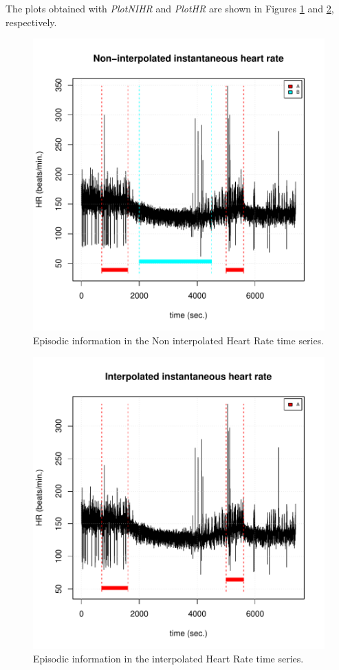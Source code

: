 \documentclass[12pt,lot, lof]{puthesis}
\begin{document}
The plots obtained with \textit{PlotNIHR} and \textit{PlotHR} are shown in 
Figures \ref{fig:plottingEpisodicNIHR} and \ref{fig:plottingEpisodicHR}, 
respectively.
\begin{figure}[h]
\centering
\includegraphics{figures/tutorial-plottingEpisodicNIHR}
\caption{Episodic information in the Non interpolated Heart Rate time 
series.\label{fig:plottingEpisodicNIHR}}
\end{figure}
\begin{figure}[h]
\centering
\includegraphics{figures/tutorial-plottingEpisodicHR}
\caption{Episodic information in the interpolated Heart Rate time 
series.\label{fig:plottingEpisodicHR}}
\end{figure}
\end{document}
